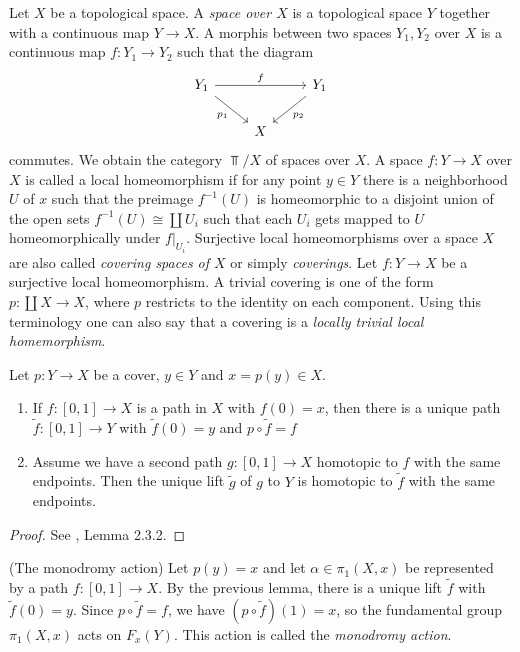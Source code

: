 \begin{construction}
    Let $X$ be a topological space. A \textit{space over $X$ } is a topological space $Y$ together with a continuous map $Y \to X$. A morphis between two spaces $Y_1, Y_2$ over $X$ is a continuous map $f: Y_1 \to Y_2$ such that the diagram
    \[
    \begin{tikzcd}
    	{Y_1} && {Y_1} \\
    	& X
    	\arrow["f", from=1-1, to=1-3]
    	\arrow["{p_2}", from=1-3, to=2-2]
    	\arrow["{p_1}"', from=1-1, to=2-2]
    \end{tikzcd}
    \]
    commutes. We obtain the category $\Top/X$ of spaces over $X$.  A space $f: Y \to X$ over $X$ is called a local homeomorphism if for any point $y \in Y$ there is a neighborhood $U$ of $x$ such that the preimage $f^{-1}(U)$ is homeomorphic to a disjoint union of the open sets $f^{-1}(U) \cong \coprod U_i$ such that each $U_i$ gets mapped to $U$ homeomorphically under $f|_{U_i}$. Surjective local homeomorphisms over a space $X$ are also called \textit{covering spaces of $X$} or simply \textit{coverings}.  Let $f: Y \to X$ be a surjective local homeomorphism.  A trivial covering is one of the form $p: \coprod X \to X$, where $p$ restricts to the identity on each component. Using this terminology one can also say that a covering is a \textit{locally trivial local homemorphism}. 
\end{construction}

\begin{lemma}
  Let $p: Y \to X$ be a cover, $y \in Y$ and $x = p(y) \in X$. 
  \begin{enumerate}
    \item If $f: [0,1] \to X$ is a path in $X$ with $f(0) = x$, then there is a unique path $\tilde{f}: [0,1] \to Y$ with $\tilde{f}(0) = y$ and $p \circ \tilde{f} = f$
    \item Assume we have a second path $g: [0,1] \to X$ homotopic to $f$ with the same endpoints. Then the unique lift $\tilde{g}$ of $g$ to $Y$ is homotopic to $\tilde{f}$ with the  same endpoints.
  \end{enumerate}
\end{lemma}
\begin{proof}
  See \cite{Szamuely}, Lemma 2.3.2.
\end{proof}
\begin{construction}(The monodromy action)
  Let $p(y)=x$ and let $\alpha \in \pi_1(X,x)$ be represented by a path $f: [0,1] \to X$. By the previous lemma, there is a unique lift $\tilde{f}$ with $\tilde{f}(0) = y$. Since $p \circ \tilde{f} = f$, we have $(p \circ \tilde{f})(1) = x$, so the fundamental group $\pi_1(X, x)$ acts on $F_x(Y)$. This action is called the \textit{monodromy action}.
\end{construction}

